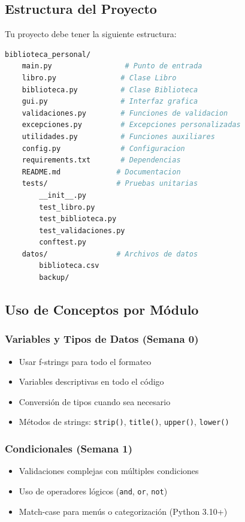\documentclass[12pt,a4paper]{article}
\begin{document}
\subsection{Estructura del Proyecto}

Tu proyecto debe tener la siguiente estructura:

\begin{lstlisting}[language=bash, caption=Estructura de directorios]
biblioteca_personal/
    main.py                 # Punto de entrada
    libro.py               # Clase Libro
    biblioteca.py          # Clase Biblioteca
    gui.py                 # Interfaz grafica
    validaciones.py        # Funciones de validacion
    excepciones.py         # Excepciones personalizadas
    utilidades.py          # Funciones auxiliares
    config.py              # Configuracion
    requirements.txt       # Dependencias
    README.md             # Documentacion
    tests/                # Pruebas unitarias
        __init__.py
        test_libro.py
        test_biblioteca.py
        test_validaciones.py
        conftest.py
    datos/                # Archivos de datos
        biblioteca.csv
        backup/
\end{lstlisting}

\subsection{Uso de Conceptos por Módulo}

\subsubsection{Variables y Tipos de Datos (Semana 0)}
\begin{itemize}[leftmargin=*]
    \item Usar f-strings para todo el formateo
    \item Variables descriptivas en todo el código
    \item Conversión de tipos cuando sea necesario
    \item Métodos de strings: \texttt{strip()}, \texttt{title()}, \texttt{upper()}, \texttt{lower()}
\end{itemize}

\subsubsection{Condicionales (Semana 1)}
\begin{itemize}[leftmargin=*]
    \item Validaciones complejas con múltiples condiciones
    \item Uso de operadores lógicos (\texttt{and}, \texttt{or}, \texttt{not})
    \item Match-case para menús o categorización (Python 3.10+)
\end{itemize}
\end{document}
